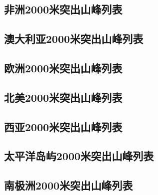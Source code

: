 \documentclass[10pt,twocolumn,letterpaper]{article}
\begin{document}
\subsection{非洲2000米突出山峰列表}

\subsection{澳大利亚2000米突出山峰列表}
\subsection{欧洲2000米突出山峰列表}

\subsection{北美2000米突出山峰列表}
\subsection{西亚2000米突出山峰列表}

\subsection{太平洋岛屿2000米突出山峰列表}

\subsection{南极洲2000米突出山峰列表}

\clearpage
\twocolumn

{\small


}
\end{document}
